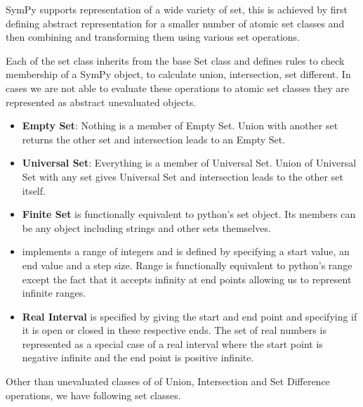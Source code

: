 
SymPy supports representation of a wide variety of set, this is achieved by
first defining abstract representation for a smaller number of atomic set
classes and then combining and transforming them using various set operations.

Each of the set class inherits from the base Set class and defines
rules to check membership of a SymPy object, to calculate union, intersection,
set different. In cases we are not able to evaluate these
operations to atomic set classes they are represented as abstract unevaluated
objects.


\begin{itemize}

    \item \textbf{Empty Set}: Nothing is a member of Empty Set. Union with
another set returns the other set and intersection leads to an Empty Set.

    \item \textbf{Universal Set}: Everything is a member of Universal Set.
Union of Universal Set with any set gives Universal Set and intersection leads
to the other set itself.

    \item \textbf{Finite Set} is functionally equivalent to python's set
object. Its members can be any object including strings and other sets
themselves.

    \item {} implements a range of integers and is defined by
specifying a start value, an end value and a step size. Range is functionally
equivalent to python's range except the fact that it accepts infinity at end
points allowing us to represent infinite ranges.


    \item \textbf{Real Interval} is specified by giving the start and end point
and specifying if it is open or closed in these respective ends. The set of
real numbers is represented as a special case of a real interval where the
start point is negative infinite and the end point is positive infinite.

\end{itemize}



Other than unevaluated classes of of Union, Intersection and Set Difference
operations, we have following set classes.

